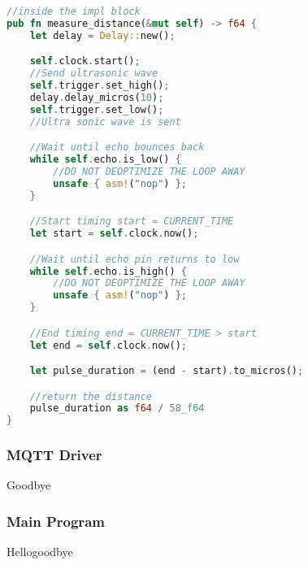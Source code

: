 \begin{lstlisting}[language=Rust]
//inside the impl block
pub fn measure_distance(&mut self) -> f64 {
    let delay = Delay::new();

    self.clock.start();
    //Send ultrasonic wave
    self.trigger.set_high();
    delay.delay_micros(10);
    self.trigger.set_low();
    //Ultra sonic wave is sent

    //Wait until echo bounces back
    while self.echo.is_low() {
        //DO NOT DEOPTIMIZE THE LOOP AWAY
        unsafe { asm!("nop") };
    }

    //Start timing start = CURRENT_TIME
    let start = self.clock.now();

    //Wait until echo pin returns to low
    while self.echo.is_high() {
        //DO NOT DEOPTIMIZE THE LOOP AWAY
        unsafe { asm!("nop") };
    }

    //End timing end = CURRENT_TIME > start
    let end = self.clock.now();

    let pulse_duration = (end - start).to_micros();

    //return the distance
    pulse_duration as f64 / 58_f64
}
\end{lstlisting}

\subsubsection{MQTT Driver}
Goodbye
\subsubsection{Main Program}
Hellogoodbye
